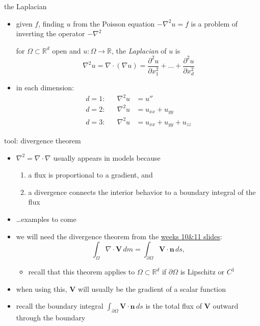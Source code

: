 \documentclass[10pt,
               svgnames,
               hyperref={colorlinks,
                         citecolor=DeepPink4,
                         linkcolor=FireBrick,
                         urlcolor=blue},
               usepdftitle=false]{beamer}
\newcommand{\bn}{\mathbf{n}}
\newcommand{\bV}{\mathbf{V}}
\newcommand{\RR}{\mathbb{R}}
\newcommand{\Div}{\nabla\cdot}
\newcommand{\grad}{\nabla}
\begin{document}
\begin{frame}{the Laplacian}

\begin{itemize}
\item given $f$, finding $u$ from the Poisson equation $- \grad^2 u = f$ is a problem of inverting the operator $-\grad^2$

\begin{definition}
for $\Omega\subset\RR^d$ open and $u:\Omega\to \RR$, the \emph{Laplacian} of $u$ is
\begin{equation*}
  \grad^2 u = \Div(\grad u) = \frac{\partial^2 u}{\partial x_1^2} +\dots + \frac{\partial^2 u}{\partial x_d^2}
\end{equation*}
\end{definition}

\item in each dimension:
\begin{align*}
d=1: && \grad^2 u &= u'' \\
d=2: && \grad^2 u &= u_{xx}+u_{yy} \\
d=3: && \grad^2 u &= u_{xx}+u_{yy}+u_{zz}
\end{align*}
\end{itemize}
\end{frame}


\begin{frame}{tool: divergence theorem}

\begin{itemize}
\item $\grad^2=\Div \grad$ usually appears in models because
\begin{enumerate}
\item a flux is proportional to a gradient, and
\item a divergence connects the interior behavior to a boundary integral of the flux
\end{enumerate}
\item \dots examples to come
\item we will need the divergence theorem from the \href{https://bueler.github.io/fa/assets/slides/S26/week10.pdf}{weeks 10\&11 slides}:
   $$\int_\Omega \Div \bV\,dm = \int_{\partial\Omega} \bV\cdot \bn\,ds,$$

   \begin{itemize}
   \item[$\circ$] recall that this theorem applies to $\Omega\subset \RR^d$ if $\partial\Omega$ is Lipschitz or $C^1$
   \end{itemize}
\item when using this, $\bV$ will usually be the gradient of a scalar function
\item recall the boundary integral $\int_{\partial\Omega} \bV\cdot \bn\,ds$ is the total flux of $\bV$ outward through the boundary
\end{itemize}
\end{frame}
\end{document}
